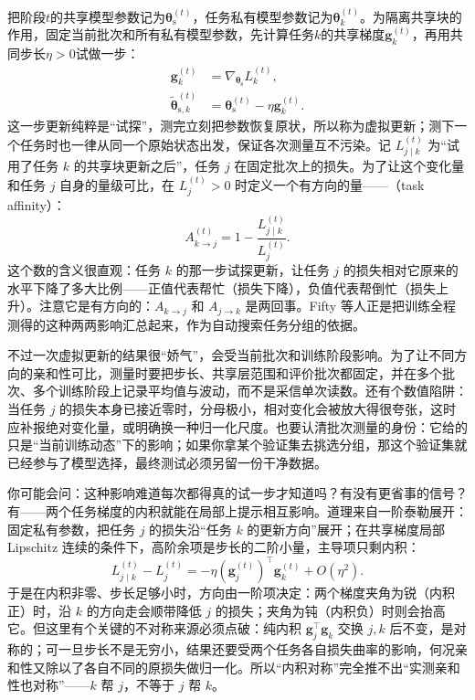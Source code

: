 把阶段$t$的共享模型参数记为$\bm{\theta}_{\mathrm{s}}^{(t)}$，任务私有模型参数记为$\bm{\theta}_k^{(t)}$。为隔离共享块的作用，固定当前批次和所有私有模型参数，先计算任务$k$的共享梯度$\bm g_k^{(t)}$，再用共同步长$\eta>0$试做一步：
\begin{align}
  \bm g_k^{(t)}
    &=\nabla_{\bm{\theta}_{\mathrm{s}}}L_k^{(t)},
  \\
  \widetilde{\bm{\theta}}_{\mathrm{s},k}^{(t)}
    &=\bm{\theta}_{\mathrm{s}}^{(t)}-\eta\bm g_k^{(t)}.
  \label{eq:ket-sharing-virtual-step}
\end{align}
这一步更新纯粹是“试探”，测完立刻把参数恢复原状，所以称为虚拟更新；测下一个任务时也一律从同一个原始状态出发，保证各次测量互不污染。记 $L_{j\mid k}^{(t)}$ 为“试用了任务 $k$ 的共享块更新之后”，任务 $j$ 在固定批次上的损失。为了让这个变化量和任务 $j$ 自身的量级可比，在 $L_j^{(t)}>0$ 时定义一个有方向的量——（task affinity）：
\begin{equation}
  A_{k\to j}^{(t)}
  =1-\frac{L_{j\mid k}^{(t)}}{L_j^{(t)}}.
  \label{eq:ket-sharing-affinity}
\end{equation}
这个数的含义很直观：任务 $k$ 的那一步试探更新，让任务 $j$ 的损失相对它原来的水平下降了多大比例——正值代表帮忙（损失下降），负值代表帮倒忙（损失上升）。注意它是有方向的：$A_{k\to j}$ 和 $A_{j\to k}$ 是两回事。Fifty 等人正是把训练全程测得的这种两两影响汇总起来，作为自动搜索任务分组的依据。

不过一次虚拟更新的结果很“娇气”，会受当前批次和训练阶段影响。为了让不同方向的亲和性可比，测量时要把步长、共享层范围和评价批次都固定，并在多个批次、多个训练阶段上记录平均值与波动，而不是采信单次读数。还有个数值陷阱：当任务 $j$ 的损失本身已接近零时，分母极小，相对变化会被放大得很夸张，这时应补报绝对变化量，或明确换一种归一化尺度。也要认清批次测量的身份：它给的只是“当前训练动态”下的影响；如果你拿某个验证集去挑选分组，那这个验证集就已经参与了模型选择，最终测试必须另留一份干净数据。

你可能会问：这种影响难道每次都得真的试一步才知道吗？有没有更省事的信号？有——两个任务梯度的内积就能在局部上提示相互影响。道理来自一阶泰勒展开：固定私有参数，把任务 $j$ 的损失沿“任务 $k$ 的更新方向”展开；在共享梯度局部 Lipschitz 连续的条件下，高阶余项是步长的二阶小量，主导项只剩内积：
\begin{equation}
  L_{j\mid k}^{(t)}-L_j^{(t)}
  =-\eta(\bm g_j^{(t)})^{\top}\bm g_k^{(t)}
  +O(\eta^2).
  \label{eq:ket-sharing-local-effect}
\end{equation}
于是在内积非零、步长足够小时，方向由一阶项决定：两个梯度夹角为锐（内积正）时，沿 $k$ 的方向走会顺带降低 $j$ 的损失；夹角为钝（内积负）时则会抬高它。但这里有个关键的不对称来源必须点破：纯内积 $\bm g_j^\top\bm g_k$ 交换 $j,k$ 后不变，是对称的；可一旦步长不是无穷小，结果还要受两个任务各自损失曲率的影响，何况亲和性又除以了各自不同的原损失做归一化。所以“内积对称”完全推不出“实测亲和性也对称”——$k$ 帮 $j$，不等于 $j$ 帮 $k$。

